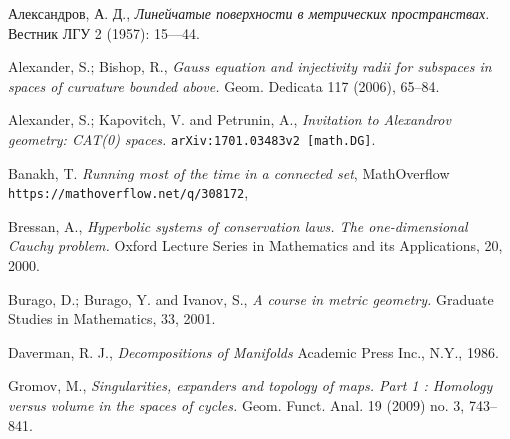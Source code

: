 \documentclass{article}
\begin{document}
\begin{thebibliography}{52}

\begin{otherlanguage}{russian}
Александров, А. Д., 
\textit{Линейчатые поверхности в метрических пространствах.}
Вестник ЛГУ 2 (1957): 15---44.
\end{otherlanguage}


 Alexander, S.; Bishop, R., \textit{Gauss equation and injectivity radii for subspaces in spaces of curvature bounded above.} 
Geom. Dedicata 117 (2006), 65--84. 


Alexander, S.; Kapovitch, V. and Petrunin, A.,
\textit{Invitation to Alexandrov geometry: CAT(0) spaces.}
\texttt{arXiv:1701.03483v2 [math.DG]}. 


 Banakh, T. \textit{Running most of the time in a connected set},  MathOverflow   \texttt{https://mathoverflow.net/q/308172}, 

 Bressan, A.,
\textit{Hyperbolic systems of conservation laws.
The one-dimensional Cauchy problem.}
Oxford Lecture Series in Mathematics and its Applications, 20, 2000.

Burago, D.; Burago, Y. and Ivanov, S.,
\textit{A course in metric geometry.}
Graduate Studies in Mathematics, 33, 2001.


 Daverman, R. J.,
\textit{Decompositions of Manifolds}
Academic Press Inc., N.Y., 1986.

 Gromov, M., \textit{Singularities, expanders and topology of maps. Part 1 : Homology versus volume in the spaces of cycles.} Geom. Funct. Anal. 19 (2009) no. 3, 743--841.







\end{thebibliography}
\end{document}
